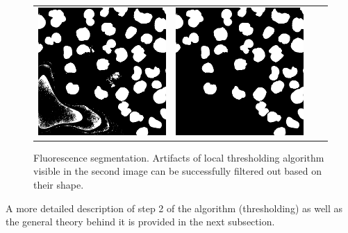 \begin{figure}[htb]
\begin{tabularx}{\textwidth}{YYYY}
            \includegraphics{bilder/segmentation/nuclei-mask/filled_holes.png} &
            \includegraphics{bilder/segmentation/nuclei-mask/mask.png}
        \end{tabularx}
    \caption[Fluorescence segmentation]%
    {Fluorescence segmentation. Artifacts of local thresholding algorithm visible in the second image can be successfully filtered out based on their shape.}
    \label{fig:segmentation-nuclei-steps}
\end{figure}

A more detailed description of step 2 of the algorithm (thresholding) as well as the general theory behind it is provided in the next subsection.
